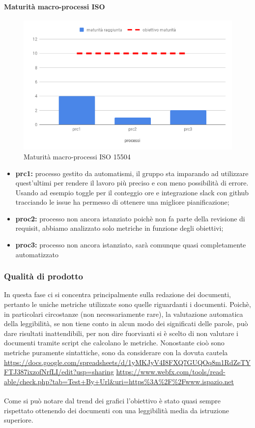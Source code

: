 \paragraph{Maturità macro-processi ISO }
\hspace{15cm}
\begin{figure}[h!]
	\centering
	\includegraphics[scale=0.5]{MaturitaProcessi.png}
	\caption{Maturità macro-processi ISO 15504}
\end{figure}
\begin{itemize}
	\item \textbf{prc1:} processo gestito da automatismi, il gruppo sta imparando ad utilizzare quest'ultimi per rendere il lavoro più preciso e con meno possibilità di errore. Usando ad esempio toggle per il conteggio ore e integrazione slack con github tracciando le issue ha
	permesso di ottenere una migliore pianificazione;
	\item \textbf{proc2:} processo non ancora istanziato poichè non fa parte della revisione di requisit, abbiamo analizzato solo metriche in funzione degli obiettivi;
	\item \textbf{proc3:} processo non ancora istanziato, sarà comunque quasi completamente automatizzato
\end{itemize}
\subsubsection{Qualità di prodotto}
In questa fase ci si concentra principalmente sulla redazione dei documenti, pertanto le uniche metriche utilizzate sono quelle riguardanti i documenti.
Poichè, in particolari circostanze (non necessariamente rare), la valutazione automatica della leggibilità, se non tiene conto in alcun modo dei significati delle parole, può dare risultati inattendibili, per non dire fuorvianti si è scelto di non valutare i documenti tramite script che calcolano le metriche.
Nonostante cioò sono metriche puramente sintattiche, sono da considerare con la dovuta cautela \\
\url{https://docs.google.com/spreadsheets/d/1yMKJyV4I8FXQ7GUQOq8m1RdZeTYFTJ387ixzofNrfLI/edit?usp=sharing}
\url{https://www.webfx.com/tools/read-able/check.php?tab=Test+By+Url&uri=https%3A%2F%2Fwww.ispazio.net}
	 \\ \\
	Come si può notare dal trend dei grafici l'obiettivo è stato quasi sempre rispettato ottenendo dei documenti con una leggibilità media da istruzione superiore.
	\clearpage
